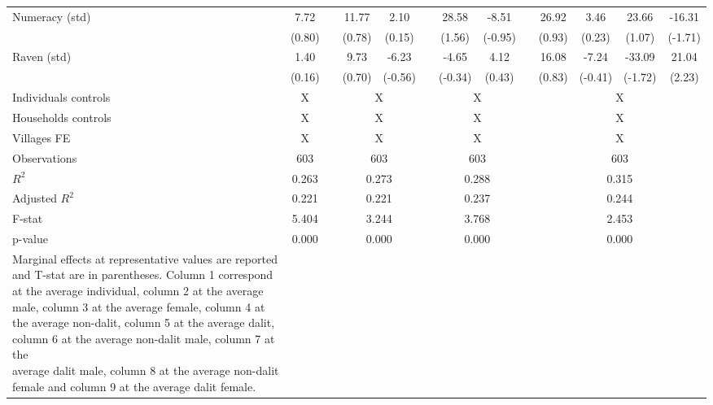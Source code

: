 \begin{table}[htbp]
{\begin{tabular}{lcccccccccccc}
    Numeracy (std) & 7.72 &   & 11.77 & 2.10 &   & 28.58 & -8.51 &   & 26.92 & 3.46 & 23.66 & -16.31 \\
      & (0.80) &   & (0.78) & (0.15) &   & (1.56) & (-0.95) &   & (0.93) & (0.23) & (1.07) & (-1.71) \\
    Raven (std) & 1.40 &   & 9.73 & -6.23 &   & -4.65 & 4.12 &   & 16.08 & -7.24 & -33.09 & 21.04 \\
      & (0.16) &   & (0.70) & (-0.56) &   & (-0.34) & (0.43) &   & (0.83) & (-0.41) & (-1.72) & (2.23) \\
\cmidrule{1-2}\cmidrule{4-5}\cmidrule{7-8}\cmidrule{10-13}  
    Individuals controls & X     &       & \multicolumn{2}{c}{X} &       & \multicolumn{2}{c}{X} &       & \multicolumn{4}{c}{X} \\
    Households controls & X     &       & \multicolumn{2}{c}{X} &       & \multicolumn{2}{c}{X} &       & \multicolumn{4}{c}{X} \\
    Villages FE & X     &       & \multicolumn{2}{c}{X} &       & \multicolumn{2}{c}{X} &       & \multicolumn{4}{c}{X} \\
    \midrule
    Observations & 603   &       & \multicolumn{2}{c}{603} &       & \multicolumn{2}{c}{603} &       & \multicolumn{4}{c}{603} \\
    $R^2$ & 0.263 &       & \multicolumn{2}{c}{0.273} &       & \multicolumn{2}{c}{0.288} &       & \multicolumn{4}{c}{0.315} \\
    Adjusted $R^2$ & 0.221 &       & \multicolumn{2}{c}{0.221} &       & \multicolumn{2}{c}{0.237} &       & \multicolumn{4}{c}{0.244} \\
    F-stat & 5.404 &       & \multicolumn{2}{c}{3.244} &       & \multicolumn{2}{c}{3.768} &       & \multicolumn{4}{c}{2.453} \\
    p-value & 0.000 &       & \multicolumn{2}{c}{0.000} &       & \multicolumn{2}{c}{0.000} &       & \multicolumn{4}{c}{0.000} \\
    \bottomrule
	\Tablenote{13}{
	Marginal effects at representative values are reported and T-stat are in parentheses. Column 1 correspond at the average individual, column 2 at the average \\ 
	male, column 3 at the average female, column 4 at the average non-dalit, column 5 at the average dalit, column 6 at the average non-dalit male, column 7 at the \\ 
	average dalit male, column 8 at the average non-dalit female and column 9 at the average dalit female.} \\
    \end{tabular}%
	}
  \label{tab:ame_loanamount}%
\end{table}%

